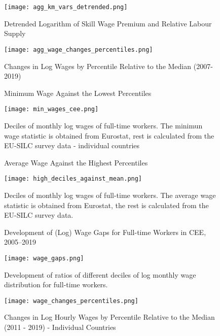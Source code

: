 \documentclass[11pt]{article}
\begin{document}
\begin{figure}[!htbp]%
    \centering
    \caption{Detrended Logarithm of Skill Wage Premium and Relative Labour Supply}
    {\texttt{[image: agg\_km\_vars\_detrended.png]} }
    \label{agg_km_vars_detrended}
\end{figure}




\begin{figure}[!htbp]%
    \centering
    \caption{Changes in Log Wages by Percentile Relative to the Median (2007-2019)}
    {\texttt{[image: agg\_wage\_changes\_percentiles.png]} }
    \label{agg_wage_changes_percentiles}
\end{figure}



\begin{figure}[!htbp]%
    \centering
    \caption{Minimum  Wage Against the Lowest Percentiles}
    {\texttt{[image: min\_wages\_cee.png]} }
    \label{low_deciles_vs_min_w_cee}
    \caption*{Deciles of monthly log wages of full-time workers. The minimun wage statistic is obtained from Eurostat, rest is calculated from the EU-SILC survey data - individual countries}
\end{figure}


\begin{figure}[!htbp]%
    \centering
    \caption{Average Wage Against the Highest Percentiles}
    {\texttt{[image: high\_deciles\_against\_mean.png]} }
    \label{high_deciles_vs_meam_w_cee}
    \caption*{\footnotesize Deciles of monthly log wages of full-time workers. The average wage statistic is obtained from Eurostat, the rest is calculated from the EU-SILC survey data. }
\end{figure}



\begin{figure}[!htbp]%
    \centering
    \caption{Development of (Log) Wage Gaps for Full-time Workers in CEE, 2005–2019}
    {\texttt{[image: wage\_gaps.png]} }
    \label{wage_gaps_CEE}
    \caption*{\footnotesize Development of ratios of different deciles of log monthly wage distribution for full-time workers. }
\end{figure}

\begin{figure}[!htbp]%
    \centering
    \caption{Changes in Log Hourly Wages by Percentile Relative to the Median (2011 - 2019) - Individual Countries}
    {\texttt{[image: wage\_changes\_percentiles.png]} }
    \label{wage_changes_percentiles}
\end{figure}
\end{document}
